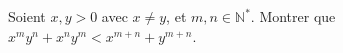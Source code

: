 Soient $x, y > 0$ avec $x \neq y$, et $m, n \in \mathbb{N}^*$. Montrer que $x^my^n + x^ny^m < x^{m+n} + y^{m+n}$.
